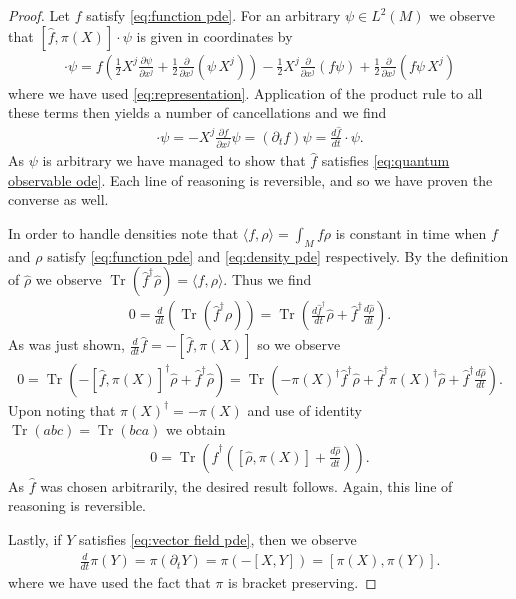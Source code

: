 \documentclass[12pt]{amsart}
\newcommand{\pder}[2]{\ensuremath{\frac{ \partial #1}{\partial #2}}}
\DeclareMathOperator{\Tr}{Tr}
\begin{document}
\begin{proof}
	Let $f$ satisfy \eqref{eq:function pde}.
	For an arbitrary $\psi \in L^{2}(M)$ we observe that $[ \hat{f} , \pi(X)] \cdot \psi$ is given in coordinates by
	\begin{align*}
		[ \hat{f} , \pi(X) ] \cdot \psi = f \left( \frac{1}{2} X^{j} \pder{\psi}{x^{j}} + \frac{1}{2} \pder{}{x^{j}} ( \psi \, X^{j} ) \right)
			- \frac{1}{2} X^{j} \pder{}{x^{j}}( f \psi)  + \frac{1}{2} \pder{}{x^{j}} (f \psi \, X^{j} )
	\end{align*}
	where we have used \eqref{eq:representation}.  Application of the product rule to all these terms then yields
	a number of cancellations and we find
	\begin{align*}
		[ \hat{f} , \pi(X) ] \cdot \psi = - X^{j} \pder{f}{x^{j}} \psi = (\partial_{t} f )\psi = \frac{d \hat{f} }{dt} \cdot \psi.
	\end{align*}
	As $\psi$ is arbitrary we have managed to show that $\hat{f}$ satisfies \eqref{eq:quantum observable ode}.
	Each line of reasoning is reversible, and so we have proven the converse as well.
	
	In order to handle densities note that $\langle f , \rho \rangle = \int_{M} f\rho$ is constant in time when $f$
	and $\rho$ satisfy \eqref{eq:function pde} and \eqref{eq:density pde} respectively.
	By the definition of $\hat{\rho}$ we observe $\Tr( \hat{f}^{\dagger} \hat{\rho}) = \langle f , \rho \rangle$.
	Thus we find
	\begin{align*}
		0 = \frac{d}{dt} \left( \Tr( \hat{f}^{\dagger} \rho ) \right) = \Tr \left( \frac{d \hat{f}^{\dagger}}{dt} \hat{\rho} + \hat{f}^{\dagger} \frac{d \hat{\rho}}{dt} \right).
	\end{align*}
	As was just shown, $\frac{d}{dt} \hat{f} =  - [\hat{f} , \pi(X) ]$ so we observe
	\begin{align*}
		0 = \Tr( - [\hat{f} , \pi(X) ]^{\dagger} \hat{\rho} + \hat{f}^{\dagger} \hat{\rho} ) = \Tr( - \pi(X)^{\dagger} \hat{f}^{\dagger} \hat{\rho} + \hat{f}^{\dagger} \pi(X)^{\dagger} \hat{\rho} + \hat{f}^{\dagger} \frac{d\hat{\rho}}{dt} ).
	\end{align*}
	Upon noting that $\pi(X)^{\dagger} = - \pi(X)$ and use of identity $\Tr( a b c) = \Tr( bc a)$ we obtain
	\begin{align*}
		0 = \Tr \left( \hat{f}^{\dagger}( [\hat{\rho} , \pi(X) ] + \frac{d \hat{\rho}}{dt} ) \right).
	\end{align*}
	As $\hat{f}$ was chosen arbitrarily, the desired result follows.
	Again, this line of reasoning is reversible.
	
	Lastly, if $Y$ satisfies \eqref{eq:vector field pde}, then we observe 
	\begin{align*}
		\frac{d}{dt} \pi(Y) = \pi ( \partial_{t} Y ) = \pi( - [X,Y] ) = [\pi(X) , \pi(Y) ].
	\end{align*}
	where we have used the fact that $\pi$ is bracket preserving.
\end{proof}
\end{document}
